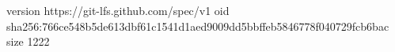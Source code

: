 version https://git-lfs.github.com/spec/v1
oid sha256:766ce548b5de613dbf61c1541d1aed9009dd5bbffeb5846778f040729fcb6bac
size 1222
